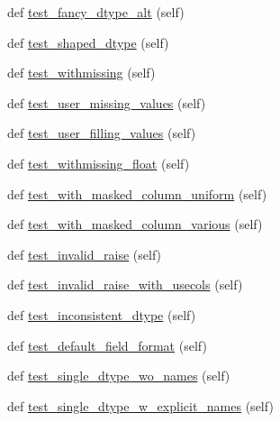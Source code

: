 \begin{DoxyCompactItemize}
def \hyperlink{classnumpy_1_1lib_1_1tests_1_1test__io_1_1TestFromTxt_a49eeec558d333197085d86bb2c704b0c}{test\+\_\+fancy\+\_\+dtype\+\_\+alt} (self)
\item 
def \hyperlink{classnumpy_1_1lib_1_1tests_1_1test__io_1_1TestFromTxt_ab44b90de69105aae7cbf2370e8813c7e}{test\+\_\+shaped\+\_\+dtype} (self)
\item 
def \hyperlink{classnumpy_1_1lib_1_1tests_1_1test__io_1_1TestFromTxt_ab634d3ef674974a7613f6628ea210cc7}{test\+\_\+withmissing} (self)
\item 
def \hyperlink{classnumpy_1_1lib_1_1tests_1_1test__io_1_1TestFromTxt_a4a8f0e2a1c916bc7bda385bc9c841d66}{test\+\_\+user\+\_\+missing\+\_\+values} (self)
\item 
def \hyperlink{classnumpy_1_1lib_1_1tests_1_1test__io_1_1TestFromTxt_aff801eef823cb9d5fdb36eea70b20432}{test\+\_\+user\+\_\+filling\+\_\+values} (self)
\item 
def \hyperlink{classnumpy_1_1lib_1_1tests_1_1test__io_1_1TestFromTxt_a3f17763877691ddb5bb948bbac3dd44c}{test\+\_\+withmissing\+\_\+float} (self)
\item 
def \hyperlink{classnumpy_1_1lib_1_1tests_1_1test__io_1_1TestFromTxt_a98fb71c551b1f76963204d02bf027255}{test\+\_\+with\+\_\+masked\+\_\+column\+\_\+uniform} (self)
\item 
def \hyperlink{classnumpy_1_1lib_1_1tests_1_1test__io_1_1TestFromTxt_add7cca77570c237a2348f6a8176a0c48}{test\+\_\+with\+\_\+masked\+\_\+column\+\_\+various} (self)
\item 
def \hyperlink{classnumpy_1_1lib_1_1tests_1_1test__io_1_1TestFromTxt_a14f1071f8ff51f69c830bbf10a65ff0d}{test\+\_\+invalid\+\_\+raise} (self)
\item 
def \hyperlink{classnumpy_1_1lib_1_1tests_1_1test__io_1_1TestFromTxt_ae2f5717d882879ecc71f708d4719adb9}{test\+\_\+invalid\+\_\+raise\+\_\+with\+\_\+usecols} (self)
\item 
def \hyperlink{classnumpy_1_1lib_1_1tests_1_1test__io_1_1TestFromTxt_ad030c2542e8b00836ffed83372b3a1c2}{test\+\_\+inconsistent\+\_\+dtype} (self)
\item 
def \hyperlink{classnumpy_1_1lib_1_1tests_1_1test__io_1_1TestFromTxt_aeea95e233334aa8b63d8addd9df7eefc}{test\+\_\+default\+\_\+field\+\_\+format} (self)
\item 
def \hyperlink{classnumpy_1_1lib_1_1tests_1_1test__io_1_1TestFromTxt_a206bba6ce3febe3ff9520de378cc74b9}{test\+\_\+single\+\_\+dtype\+\_\+wo\+\_\+names} (self)
\item 
def \hyperlink{classnumpy_1_1lib_1_1tests_1_1test__io_1_1TestFromTxt_a8520c941eecec9a5dd1e3a7d74548736}{test\+\_\+single\+\_\+dtype\+\_\+w\+\_\+explicit\+\_\+names} (self)

\end{DoxyCompactItemize}
